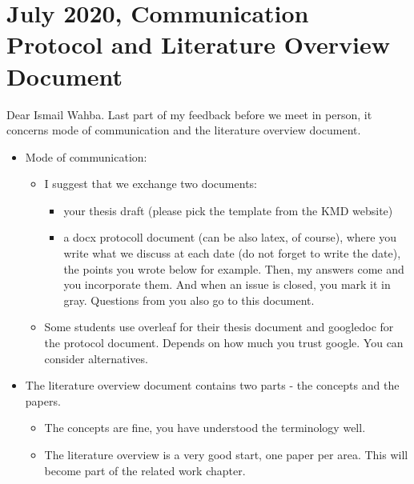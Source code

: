 \documentclass{article}
\begin{document}
\section*{\texorpdfstring{}. July 2020, Communication Protocol and Literature Overview Document}
Dear Ismail Wahba.\newline
Last part of my feedback before we meet in person, it concerns mode of communication and the literature overview document.\newline
\begin{itemize}
	\item Mode of communication:
		\begin{itemize}
			\item I suggest that we exchange two documents:
				\begin{itemize}
					\item your thesis draft (please pick the template from the KMD website)
					\item a docx protocoll document (can be also latex, of course), where you write what we discuss at each date (do not forget to write the date), the points you wrote below for example. Then, my answers come and you incorporate them. And when an issue is closed, you mark it in gray. Questions from you also go to this document.
				\end{itemize}
			\item Some students use overleaf for their thesis document and googledoc for
				  the protocol document. Depends on how much you trust google. You can
				  consider alternatives.	  
		\end{itemize}
	\item The literature overview document contains two parts - the concepts and the papers.
		\begin{itemize}
			\item The concepts are fine, you have understood the terminology well.
			\item The literature overview is a very good start, one paper per area. This will become part of the related work chapter.
\end{itemize}
\end{itemize}
\end{document}
